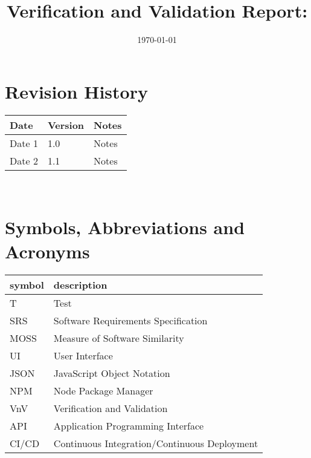 \documentclass[12pt, titlepage]{article}
\begin{document}
\title{Verification and Validation Report: \progname} 
\author{\authname}
\date{\today}
	
\maketitle


\section{Revision History}

\begin{tabularx}{\textwidth}{p{3cm}p{2cm}X}
\toprule {\bf Date} & {\bf Version} & {\bf Notes}\\
\midrule
Date 1 & 1.0 & Notes\\
Date 2 & 1.1 & Notes\\
\bottomrule
\end{tabularx}

~\newpage

\section{Symbols, Abbreviations and Acronyms}

\renewcommand{\arraystretch}{1.2}
\begin{tabular}{l l} 
  \toprule		
  \textbf{symbol} & \textbf{description}\\
  \midrule 
  T & Test\\
  SRS & Software Requirements Specification \\
  MOSS & Measure of Software Similarity \\
  UI & User Interface \\
  JSON & JavaScript Object Notation \\
  NPM & Node Package Manager \\
  VnV & Verification and Validation \\
  API & Application Programming Interface \\
  CI/CD & Continuous Integration/Continuous Deployment\\
  \bottomrule
\end{tabular}\\

\newpage

\tableofcontents

\listoftables %

\listoffigures %
\end{document}
